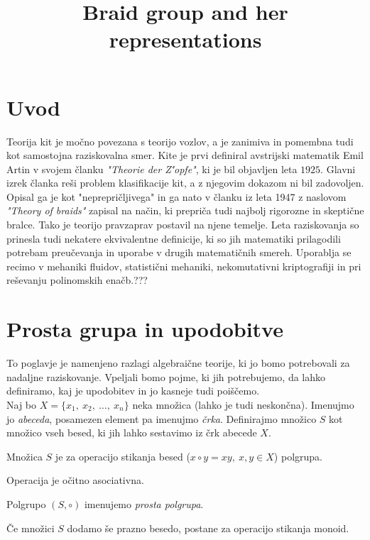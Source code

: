 \documentclass[mat1]{fmfdelo}
\title{Braid group and her representations}
\begin{document}
\section{Uvod}

Teorija kit je močno povezana s teorijo vozlov, a je zanimiva in pomembna tudi kot samostojna raziskovalna smer. Kite je prvi definiral avstrijski matematik Emil Artin v svojem članku \emph{"Theorie der Z\''{o}pfe"}, ki je bil objavljen leta $1925$. Glavni izrek članka reši problem klasifikacije kit, a z njegovim dokazom ni bil zadovoljen. Opisal ga je kot "neprepričljivega" in ga nato v članku iz leta 1947 z naslovom \emph{"Theory of braids"} zapisal na način, ki prepriča tudi najbolj rigorozne in skeptične bralce. Tako je teorijo pravzaprav postavil na njene temelje. Leta raziskovanja so prinesla tudi nekatere ekvivalentne definicije, ki so jih matematiki prilagodili potrebam preučevanja in uporabe v drugih matematičnih smereh. Uporablja se recimo v mehaniki fluidov, statistični mehaniki, nekomutativni kriptografiji in pri reševanju polinomskih enačb.???

\section{Prosta grupa in upodobitve}

To poglavje je namenjeno razlagi algebraične teorije, ki jo bomo potrebovali za nadaljne raziskovanje. Vpeljali bomo pojme, ki jih potrebujemo, da lahko definiramo, kaj je upodobitev in jo kasneje tudi poiščemo.\\
Naj bo $X = \{ x_1,\ x_2,\ \ldots,\ x_n \}$ neka množica (lahko je tudi neskončna). Imenujmo jo \emph{abeceda}, posamezen element pa imenujmo \emph{črka}. Definirajmo množico $S$ kot množico vseh besed, ki jih lahko sestavimo iz črk abecede $X$.

\begin{trditev}
Množica $S$ je za operacijo stikanja besed ($x \circ y = xy, \ x, y \in X$) polgrupa.
\end{trditev}

\begin{dokaz}
Operacija je očitno asociativna.
\end{dokaz}

\begin{opomba}
Polgrupo $(S, \circ)$ imenujemo \emph{prosta polgrupa}.
\end{opomba}

\begin{opomba}
Če množici $S$ dodamo še prazno besedo, postane za operacijo stikanja monoid.
\end{opomba}
\end{document}
